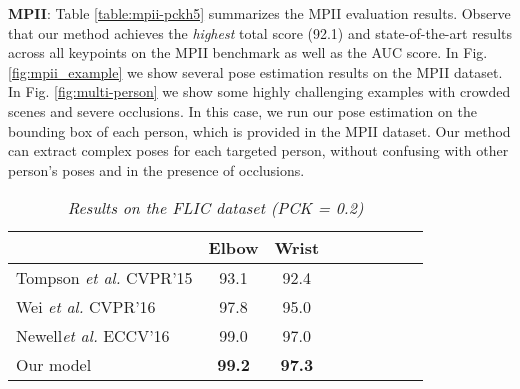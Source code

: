 \documentclass[runningheads]{llncs}
\begin{document}
{\bf MPII}:
Table \ref{table:mpii-pckh5} summarizes the MPII evaluation results. Observe that our method achieves the {\em highest} total score (92.1) and state-of-the-art results across all keypoints on the MPII benchmark as well as the AUC score. In Fig. \ref{fig:mpii_example} we show several pose estimation results on the MPII dataset. In Fig. \ref{fig:multi-person} we show some highly challenging examples with crowded scenes and severe occlusions. In this case, we run our pose estimation on the bounding box of each person, which is provided in the MPII dataset. Our method can extract complex poses for each targeted person, without confusing with other person's poses and in the presence of occlusions.



\begin{table}[t]
	\caption{\em \small 
Results on the FLIC dataset (PCK = 0.2)
	}
\begin{center}
		\begin{tabular}{l||*{7}{c}|r}
			\hline
			& Elbow & Wrist\\ \hline
			Tompson {\em et al.} CVPR'15 \cite{Tompson:Unified:Pose:NIPS2014} &93.1 &92.4 \\
			
			Wei {\em et al.} CVPR'16 \cite{wei2016convolutional}  &97.8 &95.0 \\ 
            Newell{\em et al.} ECCV'16 \cite{newell2016stacked} &99.0&97.0\\
            \hline
			Our model& \textbf{99.2} &\textbf{97.3} \\ 
			\hline 
		\end{tabular}
\end{center}
	\label{table:flic-pck5}
\end{table}
\end{document}
